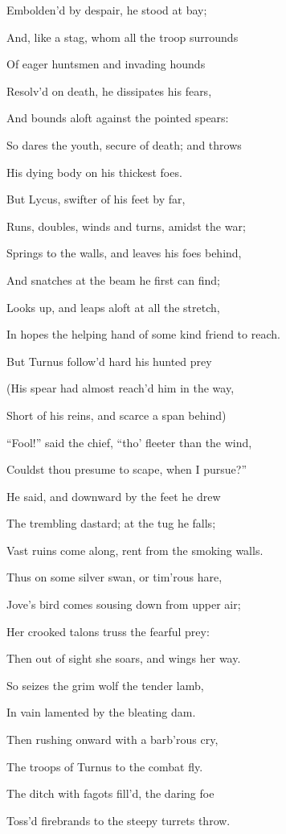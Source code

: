 Embolden’d by despair, he stood at bay;

And, like a stag, whom all the troop surrounds

Of eager huntsmen and invading hounds

Resolv’d on death, he dissipates his fears,

And bounds aloft against the pointed spears:

So dares the youth, secure of death; and throws

His dying body on his thickest foes.

But Lycus, swifter of his feet by far,

Runs, doubles, winds and turns, amidst the war;

Springs to the walls, and leaves his foes behind,

And snatches at the beam he first can find;

Looks up, and leaps aloft at all the stretch,

In hopes the helping hand of some kind friend to reach.

But Turnus follow’d hard his hunted prey

(His spear had almost reach’d him in the way,

Short of his reins, and scarce a span behind)

“Fool!” said the chief, “tho’ fleeter than the wind,

Couldst thou presume to scape, when I pursue?”

He said, and downward by the feet he drew

The trembling dastard; at the tug he falls;

Vast ruins come along, rent from the smoking walls.

Thus on some silver swan, or tim’rous hare,

Jove’s bird comes sousing down from upper air;

Her crooked talons truss the fearful prey:

Then out of sight she soars, and wings her way.

So seizes the grim wolf the tender lamb,

In vain lamented by the bleating dam.

Then rushing onward with a barb’rous cry,

The troops of Turnus to the combat fly.

The ditch with fagots fill’d, the daring foe

Toss’d firebrands to the steepy turrets throw.

